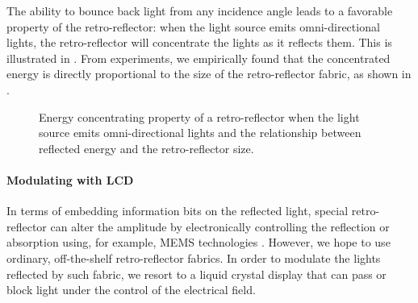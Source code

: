 The ability to bounce back light from any incidence angle leads to a favorable property of the retro-reflector: when the light source emits omni-directional lights, the retro-reflector will concentrate the lights as it reflects them. This is illustrated in . From experiments, we empirically found that the concentrated energy is directly proportional to the size of the retro-reflector fabric, as shown in . %
\begin{figure}[!th]
  \begin{center}
      \hfill
\vspace{-1em}
      \caption{Energy concentrating property of a retro-reflector when the light source emits omni-directional lights and the relationship between reflected energy and the retro-reflector size. }\label{fig:retro}
  \end{center}
\end{figure}


\paragraph{Modulating with LCD}
In terms of embedding information bits on the reflected light, special retro-reflector can alter the amplitude by electronically controlling the reflection or absorption using, for example, MEMS technologies \cite{expensive,expensive2}. However, we hope to use ordinary, off-the-shelf retro-reflector fabrics. In order to modulate the lights reflected by such fabric, we resort to a liquid crystal display that can pass or block light under the control of the electrical field. 


